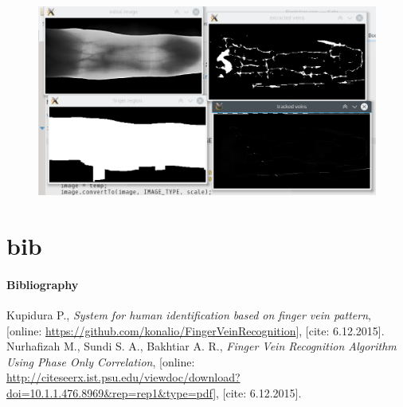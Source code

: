 \documentclass[compress]{beamer}
\begin{document}
\begin{frame}
\begin{figure}[ht!]
	\centering
	\includegraphics[width=12cm]{../fig/test_orig.eps}
\end{figure}
\end{frame}



\part{bib}
\subsection{Bibliography}
\begin{frame}
\begin{thebibliography}{10}
	Kupidura P.,
	\emph{System for human identification based on finger vein pattern},
	[online: \url{https://github.com/konalio/FingerVeinRecognition}],
	[cite: 6.12.2015].
	Nurhafizah M., Sundi S. A., Bakhtiar A. R.,
		\emph{Finger Vein Recognition Algorithm Using Phase Only Correlation},
	[online: \url{http://citeseerx.ist.psu.edu/viewdoc/download?doi=10.1.1.476.8969&rep=rep1&type=pdf}],
	[cite: 6.12.2015].

\end{thebibliography}
\end{frame}
\end{document}

